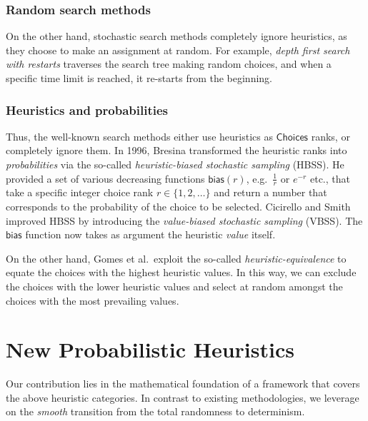 \documentclass{ws-ijait}
\begin{document}
\subsubsection{Random search methods\label{random}}

On the other hand, stochastic search methods completely
ignore heuristics, as they choose to make an assignment at
random.\cite{Jafari2011} For example, \emph{depth first
search with restarts} traverses the search tree making
random choices, and when a specific time limit is reached,
it re-starts from the beginning.

\subsubsection{Heuristics and probabilities}

Thus, the well-known search methods either use heuristics as
$\mathsf{Choices}$ ranks, or completely ignore them. In
1996, Bresina transformed the heuristic ranks into
\emph{probabilities} via the so-called
\emph{heuristic-biased stochastic sampling}
(HBSS).\cite{Bresina1996} He provided a set of various
decreasing functions $\mathsf{bias}(r)$, e.g.\ $\frac{1}{r}$
or $e^{-r}$ etc., that take a specific integer choice rank
$r \in \{1, 2, \ldots\}$ and return a number that
corresponds to the probability of the choice to be selected.
Cicirello and Smith improved HBSS by introducing the
\emph{value-biased stochastic sampling} (VBSS). The
$\mathsf{bias}$ function now takes as argument the heuristic
\emph{value} itself.\cite{Cicirello2005}

On the other hand, Gomes et al.\ exploit the so-called
\emph{heuristic-equivalence} to equate the choices with the
highest heuristic values.\cite{Gomes2000} In this way, we
can exclude the choices with the lower heuristic values and
select at random amongst the choices with the most
prevailing values.


\section{New Probabilistic Heuristics}

Our contribution lies in the mathematical foundation of a
framework that covers the above heuristic categories. In
contrast to existing methodologies, we leverage on the
\emph{smooth} transition from the total randomness to
determinism.
\end{document}
